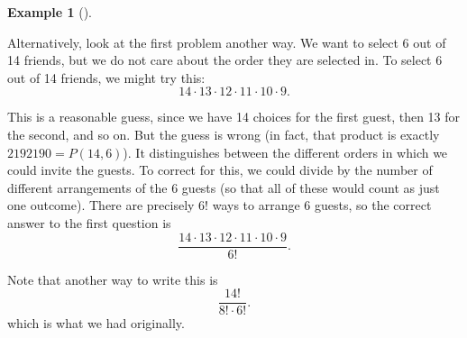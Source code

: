 \documentclass[12pt,]{book}
\theoremstyle{plain}
\theoremstyle{definition}
\theoremstyle{definition}
\newtheorem{example}[theorem]{Example}
\theoremstyle{definition}
\numberwithin{equation}{chapter}
\begin{document}
\begin{example}[]
\par
\hypertarget{p-960}{}%
Alternatively, look at the first problem another way. We want to select 6 out of 14 friends, but we do not care about the order they are selected in. To select 6 out of 14 friends, we might try this:%
\begin{equation*}
14 \cdot 13 \cdot 12 \cdot 11 \cdot 10 \cdot 9.
\end{equation*}
%
\par
\hypertarget{p-961}{}%
This is a reasonable guess, since we have 14 choices for the first guest, then 13 for the second, and so on. But the guess is wrong (in fact, that product is exactly \(2192190 = P(14,6)\)). It distinguishes between the different orders in which we could invite the guests. To correct for this, we could divide by the number of different arrangements of the 6 guests (so that all of these would count as just one outcome). There are precisely \(6!\) ways to arrange 6 guests, so the correct answer to the first question is%
\begin{equation*}
\frac{14 \cdot 13 \cdot 12 \cdot 11\cdot 10 \cdot 9}{6!}.
\end{equation*}
%
\par
\hypertarget{p-962}{}%
Note that another way to write this is%
\begin{equation*}
\frac{14!}{8!\cdot 6!}.
\end{equation*}
which is what we had originally.%
\end{example}
\typeout{************************************************}
\typeout{************************************************}
\end{document}
